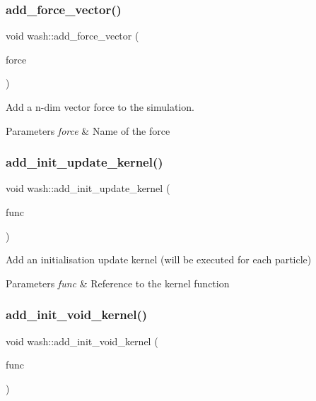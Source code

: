 \subsubsection{\texorpdfstring{add\+\_\+force\+\_\+vector()}{add\_force\_vector()}}
{\footnotesize\ttfamily void wash\+::add\+\_\+force\+\_\+vector (\begin{DoxyParamCaption}\item[{const std\+::string}]{force }\end{DoxyParamCaption})}



Add a n-\/dim vector force to the simulation. 


\begin{DoxyParams}{Parameters}
{\em force} & Name of the force \\
\hline
\end{DoxyParams}
\mbox{\label{namespacewash_a2bed8ccfb6599a8edd0eb88037d8c8af}} 
\subsubsection{\texorpdfstring{add\+\_\+init\+\_\+update\+\_\+kernel()}{add\_init\_update\_kernel()}}
{\footnotesize\ttfamily void wash\+::add\+\_\+init\+\_\+update\+\_\+kernel (\begin{DoxyParamCaption}\item[{const \mbox{\hyperlink{namespacewash_aaae2f0d4980b7c550d6de709b35f0b8e}{Update\+FuncT}}}]{func }\end{DoxyParamCaption})}



Add an initialisation update kernel (will be executed for each particle) 


\begin{DoxyParams}{Parameters}
{\em func} & Reference to the kernel function \\
\hline
\end{DoxyParams}
\mbox{\label{namespacewash_a4aa9c050821f26f11d51e72a861a1102}} 
\subsubsection{\texorpdfstring{add\+\_\+init\+\_\+void\+\_\+kernel()}{add\_init\_void\_kernel()}}
{\footnotesize\ttfamily void wash\+::add\+\_\+init\+\_\+void\+\_\+kernel (\begin{DoxyParamCaption}\item[{const \mbox{\hyperlink{namespacewash_a7de7a4195ce994df4dd54ff86e3fff20}{Void\+FuncT}}}]{func }\end{DoxyParamCaption})}



